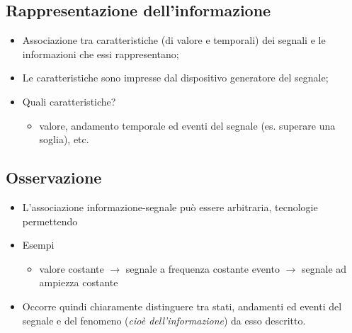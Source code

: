 \subsection{Rappresentazione dell'informazione}
\begin{itemize}
	\item Associazione tra caratteristiche (di valore e temporali) dei segnali
		e le informazioni che essi rappresentano;
	\item Le caratteristiche sono impresse dal dispositivo generatore del
		segnale;
	\item Quali caratteristiche?
		\begin{itemize}
			\item valore, andamento temporale ed eventi del segnale (es.
				superare una soglia), etc.
		\end{itemize}
\end{itemize}
\subsection{Osservazione}
\begin{itemize}
	\item L'associazione informazione-segnale può essere arbitraria,
		tecnologie permettendo
	\item Esempi
		\begin{itemize}
			\item valore costante $\to$ segnale a frequenza costante evento
				$\to$ segnale ad ampiezza costante
		\end{itemize}
	\item Occorre quindi chiaramente distinguere tra stati, andamenti ed eventi
		del segnale e del fenomeno (\textit{cioè dell'informazione}) da esso
		descritto.
\end{itemize}
